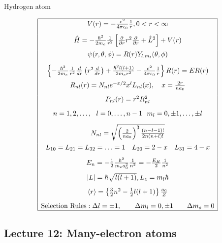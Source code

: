 \documentclass[11pt]{article}
\begin{document}
\begin{table}[H]
   \begin{center}
   \caption{Hydrogen atom}
    \label{Hydrogen atom}
\begin{displaymath}
\begin{array}{|c|}
\hline
      V(r) = -\frac{e^2}{4\pi\epsilon_0}\frac{1}{r}, 0 < r< \infty \\[0.3cm]

      \hat H = -\frac{\hbar^2}{2m_e}\frac{1}{r^2}\left [
  \frac{\partial}{\partial r}r^2\frac{\partial}{\partial r} + \hat L^2 \right ] +V(r) \\[0.3cm]

   \psi(r,\theta,\phi) = R(r)Y_{l,m_l}(\theta,\phi)  \\[0.3cm]
 \left \{ -\frac{\hbar^2}{2m_e}\frac{1}{r^2}
            \frac{d}{d r} \left ( r^2 \frac{d}{dr}\right ) + \frac{\hbar^2
              l(l+1)}{2 m_e r^2}
          -\frac{e^2}{4\pi\epsilon_0}\frac{1}{r}\right \} R(r) = E R(r)  \\[0.3cm]

 R_{nl}(r) = N_{nl} e^{-x/2} x^l L_{nl}(x),\ \ \  x = \frac{2 r}{n a_0} \\[0.3cm]

 P_{nl}(r) = r^2 R_{nl}^2 \\[0.3cm]
 n = 1, 2, \ldots,\ \  l = 0, \ldots, n-1 \ \ m_l = 0,\pm 1, \ldots, \pm l \\[0.3cm]
 N_{nl} = \sqrt{\left ( \frac{2}{na_0}\right )^3 \frac{(n-l-1)!}{2n(n+l)!}} \\[0.3cm]
 L_{10} = L_{21} = L_{32} = \ldots =1 \quad L_{20} = 2 - x \quad L_{31} = 4-x \\[0.3cm]
  E_{n}=-\frac{1}{2}\frac{\hbar^2}{m_e a_0^2}\frac{1}{n^2} =-\frac{E_H}{2}\frac{1}{n^2} \\[0.3cm]
 |L| = \hbar \sqrt{l(l+1)}, L_z = m_l \hbar  \\[0.3cm]
 \langle r \rangle = \left \{ \frac{3}{2} n^2 - \frac{1}{2} l(l+1) \right \} \frac{a_0}{Z} \\[0.3cm]

 \text{Selection Rules}:
 \Delta l = \pm 1, \qquad  \Delta m_l = 0, \pm 1\qquad \Delta m_s=0  \\
\hline
\end{array}
\end{displaymath}
 \end{center}
\end{table}
\subsection{Lecture 12: Many-electron atoms}
\label{sec:orgc616982}
\end{document}
